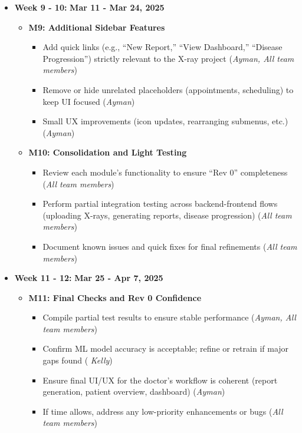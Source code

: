 \documentclass[12pt, titlepage]{article}
\newcommand{\rt}[1]{\textbf{#1}}
\begin{document}
\begin{itemize}
\item \textbf{Week 9 - 10:} \rt{Mar 11 - Mar 24, 2025} \begin{itemize} \item \textbf{M9: Additional Sidebar Features} \begin{itemize} \item Add quick links (e.g., “New Report,” “View Dashboard,” “Disease Progression”) strictly relevant to the X-ray project (\textit{Ayman, All team members}) \item Remove or hide unrelated placeholders (appointments, scheduling) to keep UI focused (\textit{Ayman}) \item Small UX improvements (icon updates, rearranging submenus, etc.) (\textit{Ayman}) \end{itemize} \item \textbf{M10: Consolidation and Light Testing} \begin{itemize} \item Review each module’s functionality to ensure “Rev 0” completeness (\textit{All team members}) \item Perform partial integration testing across backend-frontend flows (uploading X-rays, generating reports, disease progression) (\textit{All team members}) \item Document known issues and quick fixes for final refinements (\textit{All team members}) \end{itemize} \end{itemize}

\item \textbf{Week 11 - 12:} \rt{Mar 25 - Apr 7, 2025} \begin{itemize} \item \textbf{M11: Final Checks and Rev 0 Confidence} \begin{itemize} \item Compile partial test results to ensure stable performance (\textit{Ayman, All team members}) \item Confirm ML model accuracy is acceptable; refine or retrain if major gaps found (\textit{ Kelly}) \item Ensure final UI/UX for the doctor’s workflow is coherent (report generation, patient overview, dashboard) (\textit{Ayman}) \item If time allows, address any low-priority enhancements or bugs (\textit{All team members}) \end{itemize} \end{itemize} \end{itemize}
\end{document}
